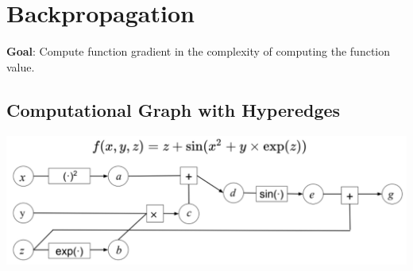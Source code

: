 \section{Backpropagation}

\textbf{Goal}: Compute function gradient in the complexity of computing the function value.

\subsection*{Computational Graph with Hyperedges}
\begin{center}
    \includegraphics[width=\columnwidth]{img/computation-graph.png}
\end{center}
\vspace{-0.5cm}
